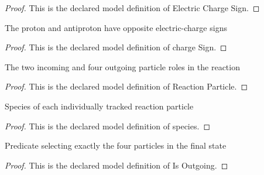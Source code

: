 \begin{proof}
  This is the declared model definition of Electric Charge Sign.
\end{proof}
\begin{definition}
  \label{def:physics:phyx-mini-0555:phyxminiproblems-problemphyxmini0555-particlespecies-chargesign}
  The proton and antiproton have opposite electric-charge signs
\end{definition}
\begin{proof}
  This is the declared model definition of charge Sign.
\end{proof}
\begin{definition}
  \label{def:physics:phyx-mini-0555:phyxminiproblems-problemphyxmini0555-reactionparticle}
  The two incoming and four outgoing particle roles in the reaction
\end{definition}
\begin{proof}
  This is the declared model definition of Reaction Particle.
\end{proof}
\begin{definition}[species]
  \label{def:physics:phyx-mini-0555:phyxminiproblems-problemphyxmini0555-reactionparticle-species}
  Species of each individually tracked reaction particle
\end{definition}
\begin{proof}
  This is the declared model definition of species.
\end{proof}
\begin{definition}[Is Outgoing]
  \label{def:physics:phyx-mini-0555:phyxminiproblems-problemphyxmini0555-reactionparticle-isoutgoing}
  Predicate selecting exactly the four particles in the final state
\end{definition}
\begin{proof}
  This is the declared model definition of Is Outgoing.
\end{proof}
